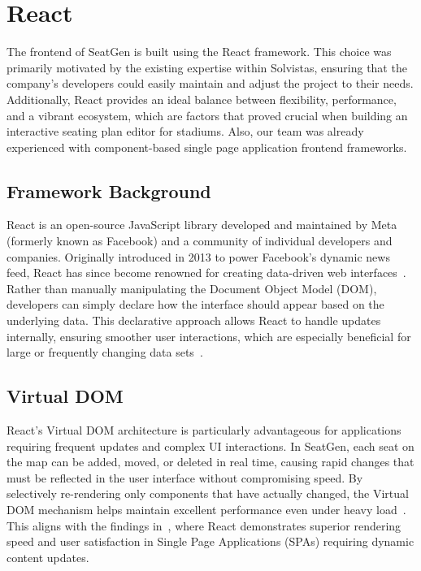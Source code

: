 \section{React}
The frontend of SeatGen is built using the React framework. This choice was primarily motivated by the existing expertise within Solvistas, ensuring that the company’s developers could easily maintain and adjust the project to their needs. Additionally, React provides an ideal balance between flexibility, performance, and a vibrant ecosystem, which are factors that proved crucial when building an interactive seating plan editor for stadiums. Also, our team was already experienced with component-based single page application frontend frameworks.

\subsection{Framework Background}
React is an open-source JavaScript library developed and maintained by Meta (formerly known as Facebook) and a community of individual developers and companies. Originally introduced in 2013 to power Facebook’s dynamic news feed, React has since become renowned for creating data-driven web interfaces~\cite{ReactDocs, SPAComp}. Rather than manually manipulating the Document Object Model (DOM), developers can simply declare how the interface should appear based on the underlying data. This declarative approach allows React to handle updates internally, ensuring smoother user interactions, which are especially beneficial for large or frequently changing data sets~\cite{ReactVirtualDOM, SPAComp}.

\subsection{Virtual DOM}
React’s Virtual DOM architecture is particularly advantageous for applications requiring frequent updates and complex UI interactions. In SeatGen, each seat on the map can be added, moved, or deleted in real time, causing rapid changes that must be reflected in the user interface without compromising speed. By selectively re-rendering only components that have actually changed, the Virtual DOM mechanism helps maintain excellent performance even under heavy load~\cite{ReactVirtualDOM}. This aligns with the findings in~\cite{SPAComp}, where React demonstrates superior rendering speed and user satisfaction in Single Page Applications (SPAs) requiring dynamic content updates.


